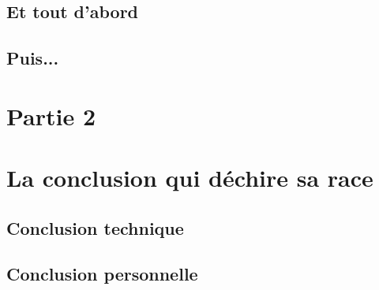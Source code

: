 \documentclass[a4paper,12pt]{report}
\begin{document}
\section{Et tout d'abord}

\lipsum[1]

\section{Puis...}

\lipsum[2]

\chapter{Partie 2}

\lipsum[1-2]

\chapter[Conclusion]{La conclusion qui déchire sa race}

\lipsum[1-2]

\section*{Conclusion technique}

\lipsum[1-2]

\section*{Conclusion personnelle}

\lipsum[1-2]
\end{document}
